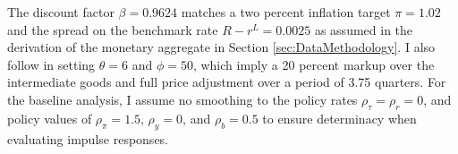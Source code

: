 \documentclass[11pt,a4paper,margin=1.5in]{article}
\begin{document}
The discount factor $\beta = 0.9624$ matches a two percent inflation target $\pi = 1.02$ and the spread on the benchmark rate $R - r^L = 0.0025$ as assumed in the derivation of the monetary aggregate in Section \ref{sec:DataMethodology}.
I also follow \citet{Belongia-Ireland:2014} in setting $\theta = 6$ and $\phi=50$, which imply a 20 percent markup over the intermediate goods and full price adjustment over a period of 3.75 quarters.
For the baseline analysis, I assume no smoothing to the policy rates $\rho_\tau = \rho_r = 0$, and policy values of $\rho_\pi = 1.5,\, \rho_y = 0$, and $\rho_b = 0.5$ to ensure determinacy when evaluating impulse responses.
\end{document}
